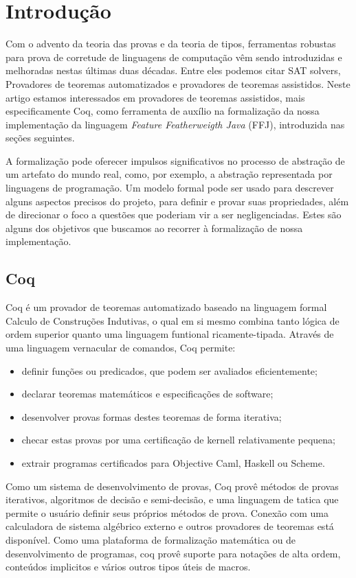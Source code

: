 \chapter{Introdução}
Com o advento da teoria das provas e da teoria de tipos, ferramentas robustas para prova de corretude de linguagens de computação vêm sendo introduzidas e melhoradas nestas últimas duas décadas. Entre eles podemos citar SAT solvers, Provadores de teoremas automatizados e provadores de teoremas assistidos.
Neste artigo estamos interessados em provadores de teoremas assistidos, mais especificamente 
Coq, como ferramenta de auxílio na formalização da nossa implementação da linguagem 
\textit{Feature Featherweigth Java} (FFJ), introduzida nas seções seguintes. 

A formalização pode oferecer impulsos significativos no processo de abstração de um artefato
do mundo real, como, por exemplo, a abstração representada por linguagens de programação. 
Um modelo formal pode ser usado 
para descrever alguns aspectos precisos do projeto, para definir e provar suas propriedades, 
além de direcionar o foco a questões que poderiam vir a ser negligenciadas. 
Estes são alguns dos objetivos que buscamos ao recorrer à formalização de nossa implementação.

	\section{Coq}
	Coq é um provador de teoremas automatizado  baseado na linguagem formal Calculo de Construções Indutivas, o qual em si mesmo combina tanto lógica de ordem superior quanto uma linguagem funtional ricamente-tipada. Através de uma linguagem vernacular de comandos, Coq permite:
	\begin{itemize}
		\item definir funções ou predicados, que podem ser avaliados eficientemente;
		\item declarar teoremas matemáticos e especificações de software;
		\item desenvolver provas formas destes teoremas de forma iterativa;
		\item checar estas provas por uma certificação de kernell relativamente pequena;
		\item extrair programas certificados para Objective Caml, Haskell ou Scheme.
	\end{itemize}
	Como um sistema de desenvolvimento de provas, Coq provê métodos de provas iterativos, algoritmos de decisão e semi-decisão, e uma linguagem de tatica que permite o usuário definir seus próprios métodos de prova. Conexão com uma calculadora de sistema algébrico externo e outros provadores de teoremas está disponível.
	Como uma plataforma de formalização matemática ou de desenvolvimento de programas, coq provê suporte para notações de alta ordem, conteúdos implicitos e vários outros tipos úteis de macros.


